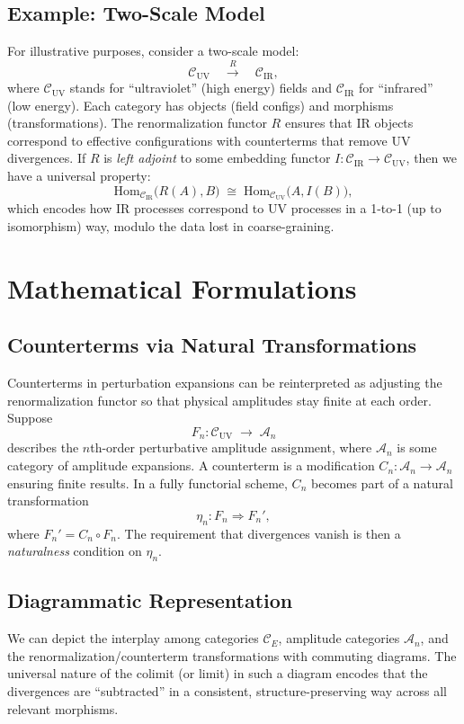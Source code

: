 \documentclass[12pt]{article}
\begin{document}
\subsection{Example: Two-Scale Model}
For illustrative purposes, consider a two-scale model:
\[
\mathcal{C}_{\text{UV}} \quad \overset{R}{\longrightarrow} \quad \mathcal{C}_{\text{IR}},
\]
where $\mathcal{C}_{\text{UV}}$ stands for “ultraviolet” (high energy) fields and $\mathcal{C}_{\text{IR}}$ for “infrared” (low energy). 
Each category has objects (field configs) and morphisms (transformations). The renormalization functor $R$ ensures 
that IR objects correspond to effective configurations with counterterms that remove UV divergences. 
If $R$ is \emph{left adjoint} to some embedding functor $I: \mathcal{C}_{\text{IR}} \to \mathcal{C}_{\text{UV}}$, 
then we have a universal property:
\[
\mathrm{Hom}_{\mathcal{C}_{\text{IR}}}\bigl(R(A),B\bigr)
\;\cong\;
\mathrm{Hom}_{\mathcal{C}_{\text{UV}}}\bigl(A, I(B)\bigr),
\]
which encodes how IR processes correspond to UV processes in a 1-to-1 (up to isomorphism) way, 
modulo the data lost in coarse-graining.

\vspace{1em}

\section{Mathematical Formulations}
\label{sec:mathFormulations}

\subsection{Counterterms via Natural Transformations}
Counterterms in perturbation expansions can be reinterpreted as adjusting the renormalization functor so that physical amplitudes 
stay finite at each order. Suppose
\[
F_n : \mathcal{C}_{\text{UV}} \;\longrightarrow\; \mathcal{A}_n
\]
describes the $n$th-order perturbative amplitude assignment, where $\mathcal{A}_n$ is some category of amplitude expansions. 
A counterterm is a modification $C_n : \mathcal{A}_n \to \mathcal{A}_n$ ensuring finite results. 
In a fully functorial scheme, $C_n$ becomes part of a natural transformation
\[
\eta_n : F_n \Longrightarrow F_n',
\]
where $F_n' = C_n \circ F_n$. The requirement that divergences vanish is then a \emph{naturalness} condition on $\eta_n$.

\subsection{Diagrammatic Representation}
We can depict the interplay among categories $\mathcal{C}_E$, amplitude categories $\mathcal{A}_n$, 
and the renormalization/counterterm transformations with commuting diagrams. 
The universal nature of the colimit (or limit) in such a diagram encodes that the divergences are “subtracted” in a consistent, 
structure-preserving way across all relevant morphisms.
\end{document}
